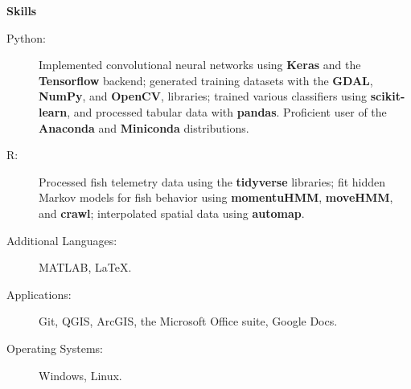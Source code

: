 \documentclass[letterpaper,11pt]{article}
\newcommand{\resheading}[1]{{\large \colorbox{mygrey}{\begin{minipage}{\textwidth}{\textbf{#1 \vphantom{p\^{E}}}}\end{minipage}}}}
\begin{document}
\resheading{Skills}
	\begin{description}
		\item[Python:] { \footnotesize Implemented convolutional neural networks using \textbf{Keras} and  the \textbf{Tensorflow} backend; generated training datasets with the \textbf{GDAL}, \textbf{NumPy}, and \textbf{OpenCV}, libraries; trained various classifiers using \textbf{scikit-learn}, and processed tabular data with \textbf{pandas}. Proficient user of the \textbf{Anaconda} and \textbf{Miniconda} distributions.}\\
		
		\item[R:] { \footnotesize Processed fish telemetry data using the \textbf{tidyverse} libraries; fit hidden Markov models for fish behavior using \textbf{momentuHMM}, \textbf{moveHMM}, and \textbf{crawl}; interpolated spatial data using \textbf{automap}.}
		
		\item[Additional Languages:] {\footnotesize MATLAB, \LaTeX.}
		
		\item[Applications:]{\footnotesize Git, QGIS, ArcGIS, the Microsoft Office suite, Google Docs.}
		
		\item[Operating Systems:] {\footnotesize Windows, Linux}.
	\end{description}
\end{document}
